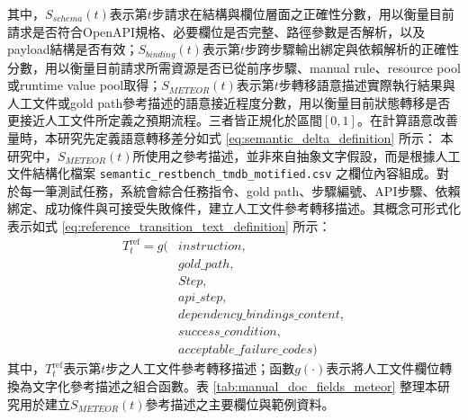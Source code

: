 \begin{ZhChapter}
\text 其中，$S_{schema}(t)$表示第$t$步請求在結構與欄位層面之正確性分數，用以衡量目前請求是否符合OpenAPI規格、必要欄位是否完整、路徑參數是否解析，以及payload結構是否有效；$S_{binding}(t)$表示第$t$步跨步驟輸出綁定與依賴解析的正確性分數，用以衡量目前請求所需資源是否已從前序步驟、manual rule、resource pool或runtime value pool取得；$S_{METEOR}(t)$表示第$t$步轉移語意描述實際執行結果與人工文件或gold path參考描述的語意接近程度分數，用以衡量目前狀態轉移是否更接近人工文件所定義之預期流程。三者皆正規化於區間$[0,1]$。\text 在計算語意改善量時，本研究先定義語意轉移差分如式 \eqref{eq:semantic_delta_definition} 所示：
\text 本研究中，$S_{METEOR}(t)$所使用之參考描述，並非來自抽象文字假設，而是根據人工文件結構化檔案 \texttt{semantic\_restbench\_tmdb\_motified.csv} 之欄位內容組成。對於每一筆測試任務，系統會綜合任務指令、gold path、步驟編號、API步驟、依賴綁定、成功條件與可接受失敗條件，建立人工文件參考轉移描述。其概念可形式化表示如式 \eqref{eq:reference_transition_text_definition} 所示：
\begin{equation}
\label{eq:reference_transition_text_definition}
\begin{aligned}
T^{\mathrm{ref}}_t = g(
&instruction,\\
&gold\_path,\\
&Step,\\
&api\_step,\\
&dependency\_bindings\_content,\\
&success\_condition,\\
&acceptable\_failure\_codes)
\end{aligned}
\end{equation}
\text 其中，$T^{\mathrm{ref}}_t$表示第$t$步之人工文件參考轉移描述；函數$g(\cdot)$表示將人工文件欄位轉換為文字化參考描述之組合函數。表 \ref{tab:manual_doc_fields_meteor} 整理本研究用於建立$S_{METEOR}(t)$參考描述之主要欄位與範例資料。


\end{ZhChapter}
